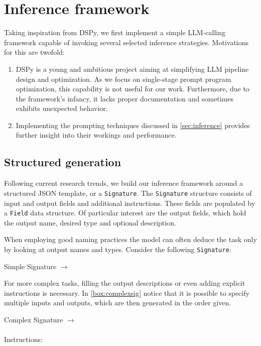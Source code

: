 \section{Inference framework}
Taking inspiration from DSPy\cite{khattab2023dspycompilingdeclarativelanguage}, we first implement a simple LLM-calling framework 
capable of invoking several selected inference strategies. Motivations for this are twofold:
\begin{enumerate}
    \item DSPy is a young and ambitious project aiming at simplifying LLM pipeline design and optimization. 
    As we focus on single-stage prompt program optimization, this capability is not useful for our work. 
    Furthermore, due to the framework's infancy, it lacks proper documentation and sometimes exhibits unexpected behavior.
    \item Implementing the prompting techniques discussed in \ref{sec:inference} provides further insight into their workings and performance.
\end{enumerate}

\subsection{Structured generation}
Following current research trends\cite{zhang2025metapromptingaisystems}, we build our inference framework around a structured JSON template,
or a \texttt{Signature}. The \texttt{Signature} structure consists of input and output fields and additional instructions. 
These fields are populated by a \texttt{Field} data structure.
Of particular interest are the output fields, which hold the output name, desired type and optional description. 

When employing good naming practices the model can often deduce the task only by looking at output names and types.
Consider the following \texttt{Signature}:
\begin{promptbox}{Simple Signature}
     $\rightarrow$ 
\end{promptbox}
\newpage
For more complex tasks, filling the output descriptions or even adding explicit instructions is necessary.
In \ref{box:complexsig} notice that it is possible to specify multiple inputs and outputs, which are then generated in the order given.
\begin{promptbox}[label={box:complexsig}]{Complex Signature}
    $\rightarrow$ 
     \hfill
    \\ \\
    Instructions:
\end{promptbox}


